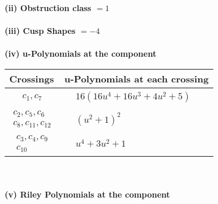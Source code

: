 \documentclass[1p]{elsarticle_modified}
\theoremstyle{definition}
\begin{document}
\flushleft \textbf{(ii) Obstruction class $= 1$}\\~\\
\flushleft \textbf{(iii) Cusp Shapes $= -4$}\\~\\
\newpage\renewcommand{\arraystretch}{1}
\flushleft \textbf{(iv) u-Polynomials at the component}\newline \\
\begin{tabular}{m{50pt}|m{274pt}}
Crossings & \hspace{64pt}u-Polynomials at each crossing \\
\hline $$\begin{aligned}c_{1},c_{7}\end{aligned}$$&$\begin{aligned}
&16(16 u^4+16 u^3+4 u^2+5)
\end{aligned}$\\
\hline $$\begin{aligned}c_{2},c_{5},c_{6}\\c_{8},c_{11},c_{12}\end{aligned}$$&$\begin{aligned}
&(u^2+1)^2
\end{aligned}$\\
\hline $$\begin{aligned}c_{3},c_{4},c_{9}\\c_{10}\end{aligned}$$&$\begin{aligned}
&u^4+3 u^2+1
\end{aligned}$\\
\hline
\end{tabular}\\~\\
\newpage\renewcommand{\arraystretch}{1}
\flushleft \textbf{(v) Riley Polynomials at the component}\newline \\
\end{document}
